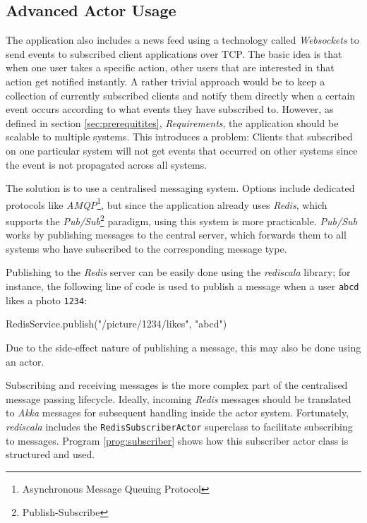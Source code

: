 \subsection{Advanced Actor Usage}
\label{lab:news}
The application also includes a news feed using a technology called \textit{Websockets} to send events to subscribed client applications over TCP. The basic idea is that when one user takes a specific action, other users that are interested in that action get notified instantly. A rather trivial approach would be to keep a collection of currently subscribed clients and notify them directly when a certain event occurs according to what events they have subscribed to. However, as defined in section \ref{sec:prerequitites}, \textit{Requirements}, the application should be scalable to multiple systems. This introduces a problem: Clients that subscribed on one particular system will not get events that occurred on other systems since the event is not propagated across all systems.

The solution is to use a centralised messaging system. Options include dedicated protocols like \textit{AMQP}\footnote{Asynchronous Message Queuing Protocol}, but since the application already uses \textit{Redis}, which supports the \textit{Pub/Sub}\footnote{Publish-Subscribe} paradigm, using this system is more practicable. \textit{Pub/Sub} works by publishing messages to the central server, which forwards them to all systems who have subscribed to the corresponding message type.

Publishing to the \textit{Redis} server can be easily done using the \textit{rediscala} library; for instance, the following line of code is used to publish a message when a user \texttt{abcd} likes a photo \texttt{1234}:
\begin{JavaCode}
RedisService.publish("/picture/1234/likes", "abcd")
\end{JavaCode}
Due to the side-effect nature of publishing a message, this may also be done using an actor. 

Subscribing and receiving messages is the more complex part of the centralised message passing lifecycle. Ideally, incoming \textit{Redis} messages should be translated to \textit{Akka} messages for subsequent handling inside the actor system. Fortunately, \textit{rediscala} includes the \texttt{RedisSubscriberActor} superclass to facilitate subscribing to messages. Program \ref{prog:subscriber} shows how this subscriber actor class is structured and used.


